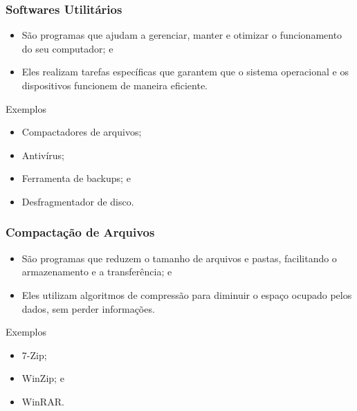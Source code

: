 \documentclass[aspectratio=169]{beamer} %
\begin{document}
\begin{frame}
	\frametitle{Softwares Utilitários}
	
	\begin{itemize}
		\item São programas que ajudam a gerenciar, manter e otimizar o funcionamento do seu computador; e
		\item Eles realizam tarefas específicas que garantem que o sistema operacional e os dispositivos funcionem de maneira eficiente.
	\end{itemize}\vfill
	
	\begin{exampleblock}{Exemplos}
		\begin{itemize}
			\item Compactadores de arquivos;
			\item Antivírus;
			\item Ferramenta de backups; e
			\item Desfragmentador de disco.
		\end{itemize}
	\end{exampleblock}
\end{frame}

\begin{frame}
	\frametitle{Compacta\c cão de Arquivos}
	
	\begin{itemize}
		\item São programas que reduzem o tamanho de arquivos e pastas, facilitando o armazenamento e a transferência; e
		\item Eles utilizam algoritmos de compressão para diminuir o espaço ocupado pelos dados, sem perder informações.
	\end{itemize} \vfill
	
	\begin{exampleblock}{Exemplos}
		\begin{itemize}
			\item 7-Zip;
			\item WinZip; e
			\item WinRAR.
		\end{itemize}
	\end{exampleblock}
\end{frame}
\end{document}

